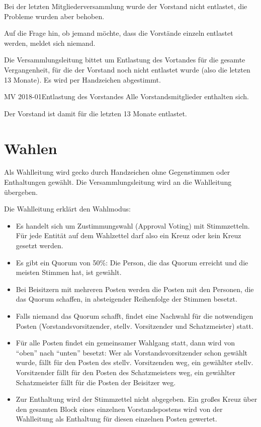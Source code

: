 \documentclass{s0minutes}
\begin{document}
Bei der letzten Mitgliederversammlung wurde der Vorstand nicht entlastet, die
Probleme wurden aber behoben.

Auf die Frage hin, ob jemand möchte, dass die Vorstände einzeln entlastet
werden, meldet sich niemand.

Die Versammlungsleitung bittet um Entlastung des Vortandes für die gesamte
Vergangenheit, für die der Vorstand noch nicht entlastet wurde (also die letzten
13 Monate). Es wird per Handzeichen abgestimmt.

\begin{resolution}{MV 2018-01}{}{Entlastung des
  Vorstandes}{}
  Alle Vorstandsmitglieder enthalten sich.
\end{resolution}

Der Vorstand ist damit für die letzten 13 Monate entlastet.

\section{Wahlen}

Als Wahlleitung wird gecko durch Handzeichen ohne Gegenstimmen oder
Enthaltungen gewählt. Die Versammlungsleitung wird an die Wahlleitung übergeben.

Die Wahlleitung erklärt den Wahlmodus:
\begin{itemize}
  \item Es handelt sich um Zustimmungswahl (Approval Voting) mit Stimmzetteln.
    Für jede Entität auf dem Wahlzettel darf also ein Kreuz oder kein Kreuz
    gesetzt werden.
  \item Es gibt ein Quorum von 50\%: Die Person, die das Quorum erreicht und die
    meisten Stimmen hat, ist gewählt.
  \item Bei Beisitzern mit mehreren Posten werden die Posten mit den Personen,
    die das Quorum schaffen, in absteigender Reihenfolge der Stimmen besetzt.
  \item Falls niemand das Quorum schafft, findet eine Nachwahl für die
    notwendigen Posten (Vorstandsvorsitzender, stellv. Vorsitzender und
    Schatzmeister) statt.
  \item Für alle Posten findet ein gemeinsamer Wahlgang statt, dann wird von
    "`oben"' nach "`unten"' besetzt: Wer als Vorstandsvorsitzender schon gewählt
    wurde, fällt für den Posten des stellv. Vorsitzenden weg, ein gewählter
    stellv. Vorsitzender fällt für den Posten des Schatzmeisters weg, ein
    gewählter Schatzmeister fällt für die Posten der Beisitzer weg.
  \item Zur Enthaltung wird der Stimmzettel nicht abgegeben. Ein großes Kreuz
    über den gesamten Block eines einzelnen Vorstandspostens wird von der
    Wahlleitung als Enthaltung für diesen einzelnen Posten gewertet.
\end{itemize}
\end{document}
